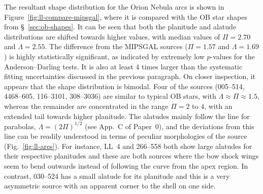 The resultant shape distribution for the Orion Nebula arcs is shown in
Figure~\ref{fig:ll-compare-mipsgal}, where it is compared with the OB
star shapes from \S~\ref{sec:ob-shapes}.  It can be seen that both the
planitude and alatude distributions are shifted towards higher values,
with median values of \(\Pi = 2.70\) and \(\Lambda = 2.55\).  The difference
from the MIPSGAL sources (\(\Pi = 1.57\) and \(\Lambda = 1.69\)) is highly
statistically significant, as indicated by extremely low \(p\)-values
for the Anderson--Darling tests.  It is also at least 4 times larger
than the systematic fitting uncertainties discussed in the previous
paragraph.  On closer inspection, it appears that the shape
distribution is bimodal.  Four of the sources (005--514, 4468--605,
116--3101, 308--3036) are similar to typical OB stars, with
\(\Lambda \approx \Pi \approx 1.5\), whereas the remainder are concentrated in the range
\(\Pi = 2\) to \(4\), with an extended tail towards higher planitude.
The alatudes mainly follow the line for parabolas,
\(\Lambda = (2\Pi)^{1/2}\) (see App.~C of Paper~0), and the deviations from
this line can be readily understood in terms of peculiar morphologies
of the source (Fig.~\ref{fig:ll-arcs}).  For instance, LL~4 and
266--558 both show large alatudes for their respective planitudes and
these are both sources where the bow shock wings seem to bend outwards
instead of following the curve from the apex region.  In contrast,
030--524 has a small alatude for its planitude and this is a very
asymmetric source with an apparent corner to the shell on one side.



